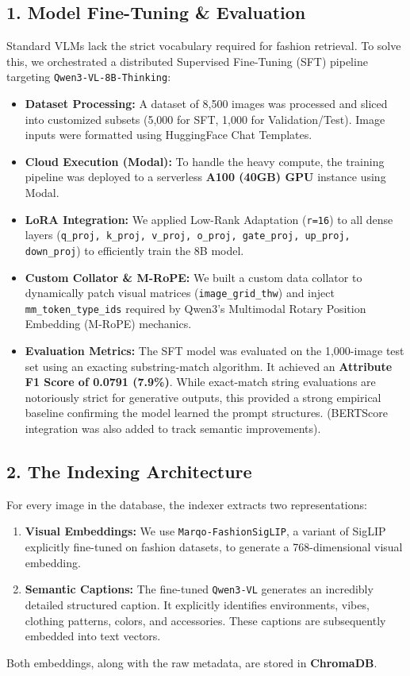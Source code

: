 \documentclass[11pt,a4paper]{article}
\begin{document}
\subsection*{1. Model Fine-Tuning \& Evaluation}
Standard VLMs lack the strict vocabulary required for fashion retrieval. To solve this, we orchestrated a distributed Supervised Fine-Tuning (SFT) pipeline targeting \texttt{Qwen3-VL-8B-Thinking}:
\begin{itemize}
    \item \textbf{Dataset Processing:} A dataset of 8,500 images was processed and sliced into customized subsets (5,000 for SFT, 1,000 for Validation/Test). Image inputs were formatted using HuggingFace Chat Templates.
    \item \textbf{Cloud Execution (Modal):} To handle the heavy compute, the training pipeline was deployed to a serverless \textbf{A100 (40GB) GPU} instance using Modal.
    \item \textbf{LoRA Integration:} We applied Low-Rank Adaptation (\texttt{r=16}) to all dense layers (\texttt{q\_proj, k\_proj, v\_proj, o\_proj, gate\_proj, up\_proj, down\_proj}) to efficiently train the 8B model. 
    \item \textbf{Custom Collator \& M-RoPE:} We built a custom data collator to dynamically patch visual matrices (\texttt{image\_grid\_thw}) and inject \texttt{mm\_token\_type\_ids} required by Qwen3's Multimodal Rotary Position Embedding (M-RoPE) mechanics.
    \item \textbf{Evaluation Metrics:} The SFT model was evaluated on the 1,000-image test set using an exacting substring-match algorithm. It achieved an \textbf{Attribute F1 Score of 0.0791 (7.9\%)}. While exact-match string evaluations are notoriously strict for generative outputs, this provided a strong empirical baseline confirming the model learned the prompt structures. (BERTScore integration was also added to track semantic improvements).
\end{itemize}

\subsection*{2. The Indexing Architecture}
For every image in the database, the indexer extracts two representations:
\begin{enumerate}
    \item \textbf{Visual Embeddings:} We use \texttt{Marqo-FashionSigLIP}, a variant of SigLIP explicitly fine-tuned on fashion datasets, to generate a 768-dimensional visual embedding. 
    \item \textbf{Semantic Captions:} The fine-tuned \texttt{Qwen3-VL} generates an incredibly detailed structured caption. It explicitly identifies environments, vibes, clothing patterns, colors, and accessories. These captions are subsequently embedded into text vectors.
\end{enumerate}
Both embeddings, along with the raw metadata, are stored in \textbf{ChromaDB}.
\end{document}
